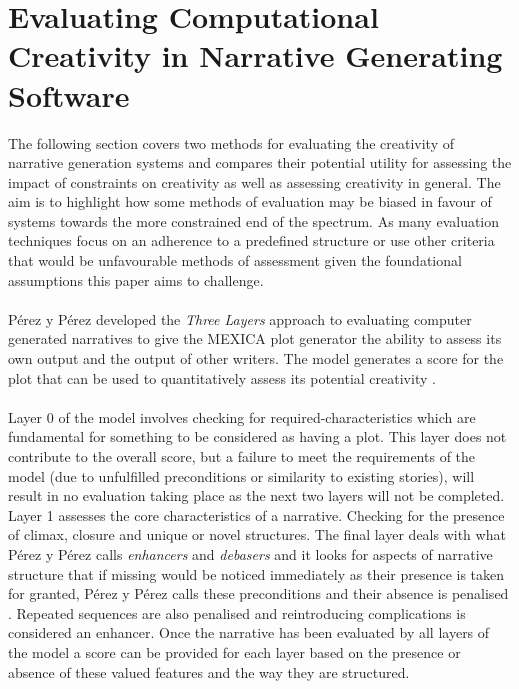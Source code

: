 \documentclass[letterpaper]{article}
\begin{document}
\section{Evaluating Computational Creativity in Narrative Generating Software} \label{sec:eval}
The following section covers two methods for evaluating the creativity of narrative generation systems and compares their potential utility for assessing the impact of constraints on creativity as well as assessing creativity in general. The aim is to highlight how  some methods of evaluation may be biased in favour of systems towards the more constrained end of the spectrum. As many evaluation techniques focus on an adherence to a predefined structure or use other criteria that would be unfavourable methods of assessment given the foundational assumptions this paper aims to challenge. 
\\
\\P\'erez y P\'erez developed the \emph{Three Layers} approach to evaluating computer generated narratives to give the MEXICA plot generator the ability to assess its own output and the output of other writers. The model generates a score for the plot that can be used to quantitatively assess its potential creativity \cite{y2014three}.\\
\\Layer 0 of the model involves checking for required-characteristics  which are fundamental for something to be considered as having a plot. This layer does not contribute to the overall score, but a failure to meet the requirements of the model (due to unfulfilled preconditions or similarity to existing stories), will result in no evaluation taking place as the next two layers will not be completed. Layer 1 assesses the core characteristics of a narrative. Checking for the presence of climax, closure and unique or novel structures. The final layer deals with what P\'erez y P\'erez calls \emph{enhancers} and \emph{debasers} and it looks for aspects of narrative structure that if missing would be noticed immediately as their presence is taken for granted, P\'erez y P\'erez calls these preconditions and their absence is  penalised \cite{y2014three}. Repeated sequences are also penalised and reintroducing complications is considered an enhancer. Once the narrative has been evaluated by all layers of the model a score can be provided for each layer based on the presence or absence of these valued features and the way they are structured.\\
\end{document}
